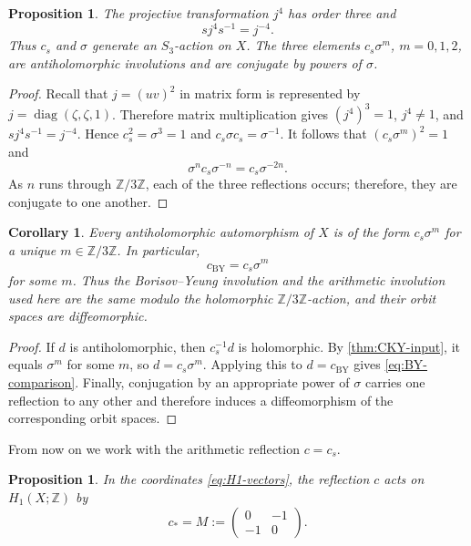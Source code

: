 \documentclass[11pt]{amsart}
\newtheorem{proposition}[theorem]{Proposition}
\newtheorem{corollary}[theorem]{Corollary}
\theoremstyle{definition}
\theoremstyle{remark}
\newcommand{\Z}{\mathbb Z}
\begin{document}
\begin{proposition}\label{prop:S3}
The projective transformation $j^4$ has order three and
\begin{equation}\label{eq:S3}
 sj^4s^{-1}=j^{-4}.
\end{equation}
Thus $c_s$ and $\sigma$ generate an $S_3$-action on $X$.  The three elements
$c_s\sigma^m$, $m=0,1,2$, are antiholomorphic involutions and are conjugate by
powers of $\sigma$.
\end{proposition}

\begin{proof}
Recall that $j=(uv)^2$ in matrix form is represented by 
$j=\operatorname{diag}(\zeta,\zeta,1)$.  Therefore matrix multiplication gives
$(j^4)^3=1$, $j^4\ne1$, and $sj^4s^{-1}=j^{-4}$.  Hence
$c_s^2=\sigma^3=1$ and $c_s\sigma c_s=\sigma^{-1}$.  It follows that
$(c_s\sigma^m)^2=1$ and
\[
 \sigma^n c_s\sigma^{-n}=c_s\sigma^{-2n}.
\]
As $n$ runs through $\mathbb Z/3\Z$, each of the three reflections
occurs; therefore, they are conjugate to one another.
\end{proof}

\begin{corollary}\label{cor:BY-comparison}
Every antiholomorphic automorphism of $X$ is of the form $c_s\sigma^m$ for a
unique $m\in\Z/3\Z$.  In particular,
\begin{equation}\label{eq:BY-comparison}
 c_{\mathrm{BY}}=c_s\sigma^m
\end{equation}
for some $m$.  Thus the Borisov--Yeung involution and the arithmetic
involution used here are the same modulo the holomorphic $\Z/3\Z$-action,
and their orbit spaces are diffeomorphic.
\end{corollary}

\begin{proof}
If $d$ is antiholomorphic, then $c_s^{-1}d$ is holomorphic.  By
\cref{thm:CKY-input}, it equals $\sigma^m$ for some $m$, so
$d=c_s\sigma^m$.  Applying this to $d=c_{\mathrm{BY}}$ gives
\eqref{eq:BY-comparison}.  Finally, conjugation by an appropriate
power of $\sigma$ carries one reflection to any other and therefore
induces a diffeomorphism of the corresponding orbit spaces.
\end{proof}

From now on we work with the arithmetic reflection $c=c_s$.

\begin{proposition}\label{prop:H1-action}
  In the coordinates \eqref{eq:H1-vectors}, the reflection $c$ acts on
  $H_1(X; \Z)$ by
\begin{equation}\label{eq:M}
 c_*=M:=\begin{pmatrix}0&-1\\-1&0\end{pmatrix}.
\end{equation}
\end{proposition}
\end{document}
